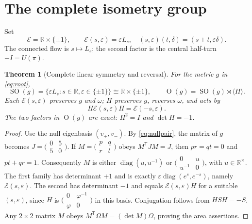 \documentclass[10pt,letterpaper]{article}
\newtheorem{theorem}{Theorem}[section]
\theoremstyle{definition}\newtheorem{definition}[theorem]{Definition}
\newcommand{\RR}{\mathbb R}
\newcommand{\Id}{I}
\newcommand{\eps}{\varepsilon}
\newcommand{\SO}{\operatorname{SO}}
\newcommand{\OO}{\operatorname{O}}
\newcommand{\aE}{\mathcal E}
\newcommand{\ph}{\varphi}
\begin{document}
\section{The complete isometry group}\label{sec:isom}
Set
\begin{equation}\label{eq:group}
 \aE=\RR\times\{\pm1\},\qquad
 \mathcal E(s,\eps)=\eps L_s,
 \quad (s,\eps)(t,\delta)=(s+t,\eps\delta).
\end{equation}
The connected flow is $s\mapsto L_s$; the second factor is the central half-turn $-\Id=U(\pi)$.

\begin{theorem}[Complete linear symmetry and reversal]\label{thm:fullgroup}
For the metric $g$ in \eqref{eq:root},
\begin{equation}\label{eq:orthgroup}
 \SO(g)=\{\eps L_s:s\in\RR,\eps\in\{\pm1\}\}\cong\RR\times\{\pm1\},
 \qquad \OO(g)=\SO(g)\rtimes\langle H\rangle.
\end{equation}
Each $\mathcal E(s,\eps)$ preserves $g$ and $\omega$; $H$ preserves $g$, reverses $\omega$, and acts by
\begin{equation}\label{eq:reverse}
 H\mathcal E(s,\eps)H=\mathcal E(-s,\eps).
\end{equation}
The two factors in $\OO(g)$ are exact: $H^2=\Id$ and $\det H=-1$.
\end{theorem}
\begin{proof}
Use the null eigenbasis $(v_+,v_-)$. By \eqref{eq:nullpair}, the matrix of $g$ becomes $J=\bigl(\begin{smallmatrix}0&5\\5&0\end{smallmatrix}\bigr)$. If $M=\bigl(\begin{smallmatrix}p&q\\r&t\end{smallmatrix}\bigr)$ obeys $M^{\mathsf T}JM=J$, then $pr=qt=0$ and $pt+qr=1$. Consequently $M$ is either $\operatorname{diag}(u,u^{-1})$ or $\bigl(\begin{smallmatrix}0&u\\u^{-1}&0\end{smallmatrix}\bigr)$, with $u\in\RR^\times$. The first family has determinant $+1$ and is exactly $\eps\operatorname{diag}(e^s,e^{-s})$, namely $\mathcal E(s,\eps)$. The second has determinant $-1$ and equals $\mathcal E(s,\eps)H$ for a suitable $(s,\eps)$, since $H$ is $\bigl(\begin{smallmatrix}0&\ph^{-1}\\\ph&0\end{smallmatrix}\bigr)$ in this basis. Conjugation follows from $HSH=-S$. Any $2\times2$ matrix $M$ obeys $M^{\mathsf T}\Omega M=(\det M)\Omega$, proving the area assertions.
\end{proof}
\end{document}
